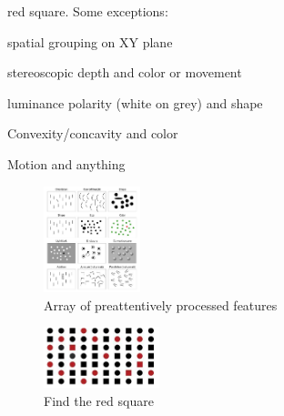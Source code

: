 \begin{mdframed}
\begin{multicols}{2}
\begin{compactdesc}
        red square. Some exceptions:
        \begin{compactenum}
        \item spatial grouping on XY plane
        \item stereoscopic depth and color or movement
        \item luminance polarity (white on grey) and shape
        \item Convexity/concavity and color
        \item Motion and anything
        \end{compactenum}
\end{compactdesc}
\end{multicols}
\end{mdframed}



\begin{mdframed}\begin{multicols}{2}
    \begin{figure}[H]
        \centering
        \includegraphics[width=0.25\textwidth]{preattentive.png}
        \caption{Array of preattentively processed features}
    \end{figure}


    \begin{figure}[H]
        \centering
        \includegraphics[width=0.3\textwidth]{find_red_square.png}
        \caption{Find the red square}
    \end{figure}

\end{multicols}
\end{mdframed}



